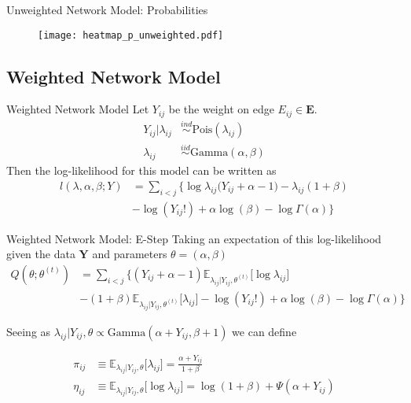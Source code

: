 \documentclass[handout]{beamer}
\begin{document}
\begin{frame}{Unweighted Network Model: Probabilities}
\begin{figure}
    \centering
    \texttt{[image: heatmap\_p\_unweighted.pdf]}
    \end{figure}
\end{frame}

\subsection{Weighted Network Model}

\begin{frame}{Weighted Network Model}
Let $Y_{ij}$ be the weight on edge $E_{ij}\in \mathbf{E}$.     
    \begin{align*}
    Y_{ij} | \lambda_{ij} &\overset{ind}\sim \text{Pois}(\lambda_{ij}) \\
    \lambda_{ij} &\overset{iid}\sim \text{Gamma}(\alpha, \beta)
\end{align*}
Then the log-likelihood for this model can be written as 
\begin{align*}
l(\lambda, \alpha, \beta ; Y) &= \sum_{i<j}\Big\{ \log \lambda_{ij}\big(Y_{ij} + \alpha - 1) - \lambda_{ij}(1+ \beta)\\
 &-\log(Y_{ij}!) + \alpha \log(\beta) - \log \Gamma(\alpha)\Big\}
\end{align*}
\end{frame}

\begin{frame}{Weighted Network Model: E-Step}
Taking an expectation of this log-likelihood given the data $\mathbf{Y}$ and parameters $\theta = (\alpha, \beta)$ 
\begin{align*}
Q(\theta; \theta^{(t)})  &= \sum_{i<j}\Big\{ (Y_{ij}+ \alpha - 1)\mathbb{E}_{\lambda_{ij}|Y_{ij}, \theta^{(t)}} \big[\log \lambda_{ij}\big] \\
    &- (1+ \beta)\mathbb{E}_{\lambda_{ij}|Y_{ij}, \theta^{(t)}}\big[\lambda_{ij}\big] -\log(Y_{ij}!) + \alpha \log(\beta) - \log \Gamma(\alpha)\Big\}
\end{align*}\pause

Seeing as $\lambda_{ij}|Y_{ij}, \theta \propto \text{Gamma}(\alpha + Y_{ij}, \beta + 1)$  we can define 

\begin{align*}
\pi_{ij} &\equiv \mathbb{E}_{\lambda_{ij}|Y_{ij}, \theta}\big[\lambda_{ij} \big] = \frac{\alpha + Y_{ij}}{1+ \beta} \\
\eta_{ij} &\equiv \mathbb{E}_{\lambda_{ij}|Y_{ij}, \theta}\big[\log \lambda_{ij} \big] = \log(1 + \beta) + \Psi (\alpha + Y_{ij})
\end{align*}

\end{frame}
\end{document}
